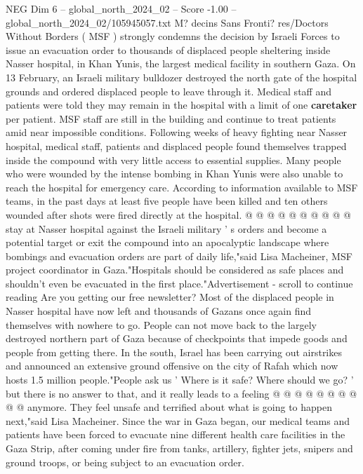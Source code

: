\begin{textsample}{NEG Dim 6 – global\_north\_2024\_02 – Score -1.00 – global\_north\_2024\_02/105945057.txt}  \label{ex:f6_neg_283}
M? decins Sans Fronti? res/Doctors Without Borders ( MSF ) strongly condemns the decision by Israeli Forces to issue an evacuation order to thousands of displaced people sheltering inside Nasser hospital, in Khan Yunis, the largest medical facility in southern Gaza.
On 13 February, an Israeli military bulldozer destroyed the north gate of the hospital grounds and ordered displaced people to leave through it.
Medical staff and patients were told they may remain in the hospital with a limit of one \textbf{caretaker} per patient.
MSF staff are still in the building and continue to treat patients amid near impossible conditions.
Following weeks of heavy fighting near Nasser hospital, medical staff, patients and displaced people found themselves trapped inside the compound with very little access to essential supplies.
Many people who were wounded by the intense bombing in Khan Yunis were also unable to reach the hospital for emergency care.
According to information available to MSF teams, in the past days at least five people have been killed and ten others wounded after shots were fired directly at the hospital. @ @ @ @ @ @ @ @ @ @ stay at Nasser hospital against the Israeli military ' s orders and become a potential target or exit the compound into an apocalyptic landscape where bombings and evacuation orders are part of daily life,"said Lisa Macheiner, MSF project coordinator in Gaza."Hospitals should be considered as safe places and shouldn't even be evacuated in the first place."Advertisement - scroll to continue reading Are you getting our free newsletter?
Most of the displaced people in Nasser hospital have now left and thousands of Gazans once again find themselves with nowhere to go.
People can not move back to the largely destroyed northern part of Gaza because of checkpoints that impede goods and people from getting there.
In the south, Israel has been carrying out airstrikes and announced an extensive ground offensive on the city of Rafah which now hosts 1.5 million people."People ask us ' Where is it safe?
Where should we go? ' but there is no answer to that, and it really leads to a feeling @ @ @ @ @ @ @ @ @ @ anymore.
They feel unsafe and terrified about what is going to happen next,"said Lisa Macheiner.
Since the war in Gaza began, our medical teams and patients have been forced to evacuate nine different health care facilities in the Gaza Strip, after coming under fire from tanks, artillery, fighter jets, snipers and ground troops, or being subject to an evacuation order.

\end{textsample}
